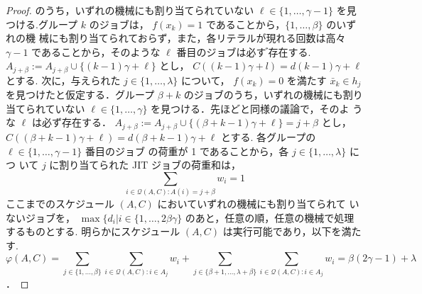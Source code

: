 \documentclass[12pt]{optlab-bachelor}
\begin{document}
\begin{proof}
  のうち，いずれの機械にも割り当てられていない $\ell \in
  \{1,\ldots,\gamma - 1\}$ を見つける.グループ $k$ のジョブは，
  $f (x_k) = 1$ であることから，$\{1,\ldots, \beta \}$ のいずれの機
  械にも割り当てられておらず，また，各リテラルが現れる回数は高々
  $\gamma − 1$ であることから，そのような $\ell$ 番目のジョブは必す
  ゙存在する. $A_{j + \beta} := A_{j + \beta} \cup \{ (k − 1) \gamma +
  \ell\}$ とし， $C((k − 1)\gamma + l) = d(k−1)\gamma + \ell$ とする.
  次に，与えられた $j \in \{1,\ldots,\lambda\}$ について， $f(x_k) = 0$
  を満たす $\bar x_k \in h_j$ を見つけたと仮定する．グループ $\beta
  + k$ のジョブのうち，いずれの機械にも割り当てられていない $\ell
  \in \{1,\ldots,\gamma\}$ を見つける．先ほどと同様の議論で，そのよ
  うな $\ell$ は必ず存在する． $A_{j + \beta} := A_{j + \beta} \cup \{
  (\beta + k − 1 ) \gamma + \ell \} = j + \beta$ とし，$C((\beta + k −
  1) \gamma + \ell) = d(\beta + k − 1)\gamma + \ell$ とする.
  各グループの $\ell \in \{1,\ldots,\gamma − 1\}$ 番目のジョブ
  の荷重が 1 であることから，各 $j \in \{1,\ldots, \lambda \}$ につ
  いて $j$ に割り当てられた JIT ジョブの荷重和は，
  $$\displaystyle \sum_{i \in \mathcal{Q}(A,C):A(i) = j + \beta}w_i =
  1$$
  ここまでのスケジュール $(A, C)$ においていずれの機械にも割り当てられて
  いないジョブを， $\max\{d_i | i \in \{1,\ldots, 2\beta \gamma\}$ のあと，任意の順，任意の機械で処理するものとする.
  明らかにスケジュール $(A, C)$ は実行可能であり，以下を満たす.
  $$\displaystyle \varphi(A,C) = \sum_{j \in
  \{1,\ldots,\beta\}} \sum_{i \in \mathcal{Q}(A,C):i \in
  A_j}w_i + \sum_{j \in
  \{\beta + 1,\ldots,\lambda + \beta\}} \sum_{i \in \mathcal{Q}(A,C):i \in
  A_j}w_i =
  \beta(2\gamma - 1) + \lambda$$．
\end{proof}
\end{document}
